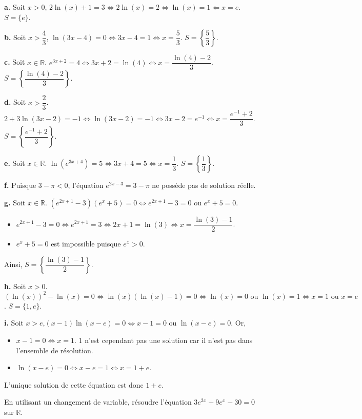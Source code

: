 \documentclass[11pt,fleqn, openany]{book} %
\begin{document}
\begin{solution}
\textbf{a.} Soit $x>0$, $2\ln(x)+1=3 \Leftrightarrow 2\ln(x)=2 \Leftrightarrow \ln(x)=1 \Leftarrow x =e$. $S=\{e\}$.

\textbf{b.} Soit $x> \dfrac{4}{3}$, $\ln(3x-4)=0 \Leftrightarrow 3x-4=1 \Leftrightarrow x=\dfrac{5}{3}$. $S=\left\{\dfrac{5}{3}\right\}$.

\textbf{c.} Soit $x\in\mathbb{R}$. $e^{3x+2}=4 \Leftrightarrow 3x+2=\ln(4) \Leftrightarrow x=\dfrac{\ln(4)-2}{3}$. $S=\left\{\dfrac{\ln(4)-2}{3}\right\}$.

\textbf{d.} Soit $x > \dfrac{2}{3}$. $2+3\ln(3x-2)=-1 \Leftrightarrow \ln(3x-2)=-1 \Leftrightarrow 3x-2 =e^{-1} \Leftrightarrow x =\dfrac{e^{-1}+2}{3}$. $S=\left\{\dfrac{e^{-1}+2}{3}\right\}$.

\textbf{e.} Soit $x\in \mathbb{R}$. $\ln(e^{3x+4})=5 \Leftrightarrow 3x+4=5 \Leftrightarrow x= \dfrac{1}{3}$. $S=\left\{\dfrac{1}{3}\right\}$.

\textbf{f.} Puisque $3-\pi <0$, l'équation $e^{2x-3}=3-\pi$ ne possède pas de solution réelle.

\textbf{g.} Soit $x\in \mathbb{R}$. $(e^{2x+1}-3)(e^x+5)=0 \Leftrightarrow e^{2x+1}-3=0  \text{ ou } e^x+5=0$.
\begin{itemize}
\item $e^{2x+1}-3=0 \Leftrightarrow e^{2x+1}=3 \Leftrightarrow 2x+1=\ln(3) \Leftrightarrow x=\dfrac{\ln(3)-1}{2}$.
\item $e^x+5=0$ est impossible puisque $e^x>0$.
\end{itemize}
Ainsi, $S=\left\{ \dfrac{\ln(3)-1}{2}\right\}$.

\textbf{h.} Soit $x>0$. $(\ln(x))^2-\ln(x)=0 \Leftrightarrow \ln(x) (\ln(x)-1)=0 \Leftrightarrow \ln(x)=0 \text{ ou } \ln(x)=1 \Leftrightarrow x=1 \text{ ou } x=e$. $S=\{1,e\}$.

\textbf{i.} Soit \(x>e\),\((x-1)\ln(x-e)=0 \Leftrightarrow x-1=0\) ou \(\ln(x-e)=0\). Or,
\begin{itemize}
\item \(x-1 = 0\Leftrightarrow x=1\). 1 n'est cependant pas une solution car il n'est pas dans l'ensemble de résolution.
\item \(\ln(x-e)=0 \Leftrightarrow x-e=1 \Leftrightarrow x=1+e\).\end{itemize}
L'unique solution de cette équation est donc \(1+e\).
\end{solution}



\begin{exercise}[topic=log01]En utilisant un changement de variable, résoudre l'équation $3e^{2x}+9e^x-30=0$ sur $\mathbb{R}$.\end{exercise}
\end{document}
